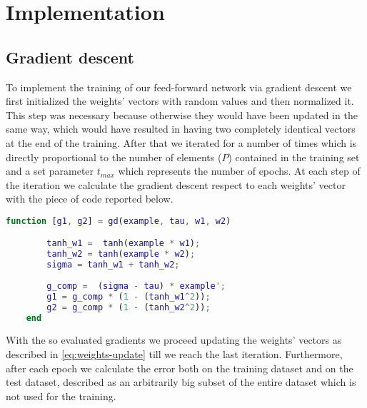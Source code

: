 \section{Implementation}
\label{sec:implementation}

\subsection{Gradient descent}
To implement the training of our feed-forward network via gradient descent we first initialized the weights' vectors with random values and then
normalized it. This step was necessary because otherwise they would have been updated in the same way, which would have resulted
in having two completely identical vectors at the end of the training.
After that we iterated for a number of times which is directly proportional to the number of elements ($P$) contained in the training set and a set parameter
$t_{max}$ which represents the number of epochs. At each step of the iteration we calculate the gradient descent respect to each weights' vector
with the piece of code reported below.

\begin{lstlisting}[language=Matlab] 
    function [g1, g2] = gd(example, tau, w1, w2)

        tanh_w1 =  tanh(example * w1);
        tanh_w2 = tanh(example * w2);
        sigma = tanh_w1 + tanh_w2;
        
        g_comp =  (sigma - tau) * example';
        g1 = g_comp * (1 - (tanh_w1^2));
        g2 = g_comp * (1 - (tanh_w2^2));
    end
\end{lstlisting}

With the so evaluated gradients we proceed updating the weights' vectors as described in \cref{eq:weights-update} till we reach the last iteration.
Furthermore, after each epoch we calculate the error both on the training dataset and on the test dataset, described as an arbitrarily big subset
of the entire dataset which is not used for the training.